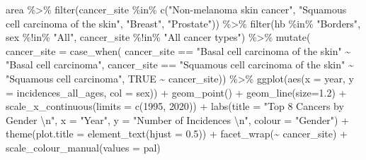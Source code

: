 \documentclass[
]{article}
\newenvironment{Shaded}{\begin{snugshade}}{\end{snugshade}}
\newcommand{\AttributeTok}[1]{\textcolor[rgb]{0.77,0.63,0.00}{#1}}
\newcommand{\ConstantTok}[1]{\textcolor[rgb]{0.00,0.00,0.00}{#1}}
\newcommand{\DecValTok}[1]{\textcolor[rgb]{0.00,0.00,0.81}{#1}}
\newcommand{\FloatTok}[1]{\textcolor[rgb]{0.00,0.00,0.81}{#1}}
\newcommand{\FunctionTok}[1]{\textcolor[rgb]{0.00,0.00,0.00}{#1}}
\newcommand{\NormalTok}[1]{#1}
\newcommand{\SpecialCharTok}[1]{\textcolor[rgb]{0.00,0.00,0.00}{#1}}
\newcommand{\StringTok}[1]{\textcolor[rgb]{0.31,0.60,0.02}{#1}}
\begin{document}
\begin{Shaded}
\begin{Highlighting}[]
\NormalTok{area }\SpecialCharTok{\%\textgreater{}\%} 
  \FunctionTok{filter}\NormalTok{(cancer\_site }\SpecialCharTok{\%in\%} \FunctionTok{c}\NormalTok{(}\StringTok{"Non{-}melanoma skin cancer"}\NormalTok{,}
                            \StringTok{"Squamous cell carcinoma of the skin"}\NormalTok{, }\StringTok{"Breast"}\NormalTok{,}
                            \StringTok{"Prostate"}\NormalTok{)) }\SpecialCharTok{\%\textgreater{}\%}
  \FunctionTok{filter}\NormalTok{(hb }\SpecialCharTok{\%in\%} \StringTok{"Borders"}\NormalTok{,}
\NormalTok{         sex }\SpecialCharTok{\%!in\%} \StringTok{"All"}\NormalTok{,}
\NormalTok{         cancer\_site }\SpecialCharTok{\%!in\%} \StringTok{"All cancer types"}\NormalTok{) }\SpecialCharTok{\%\textgreater{}\%} 
  \FunctionTok{mutate}\NormalTok{(}
  \AttributeTok{cancer\_site =} \FunctionTok{case\_when}\NormalTok{(}
\NormalTok{    cancer\_site }\SpecialCharTok{==} \StringTok{"Basal cell carcinoma of the skin"} \SpecialCharTok{\textasciitilde{}} \StringTok{"Basal cell carcinoma"}\NormalTok{,}
\NormalTok{    cancer\_site }\SpecialCharTok{==} \StringTok{"Squamous cell carcinoma of the skin"} \SpecialCharTok{\textasciitilde{}} \StringTok{"Squamous cell carcinoma"}\NormalTok{,}
    \ConstantTok{TRUE} \SpecialCharTok{\textasciitilde{}}\NormalTok{ cancer\_site)) }\SpecialCharTok{\%\textgreater{}\%} 
  \FunctionTok{ggplot}\NormalTok{(}\FunctionTok{aes}\NormalTok{(}\AttributeTok{x =}\NormalTok{ year, }\AttributeTok{y =}\NormalTok{ incidences\_all\_ages, }\AttributeTok{col =}\NormalTok{ sex)) }\SpecialCharTok{+}
  \FunctionTok{geom\_point}\NormalTok{() }\SpecialCharTok{+}
  \FunctionTok{geom\_line}\NormalTok{(}\AttributeTok{size=}\FloatTok{1.2}\NormalTok{) }\SpecialCharTok{+}
  \FunctionTok{scale\_x\_continuous}\NormalTok{(}\AttributeTok{limits =} \FunctionTok{c}\NormalTok{(}\DecValTok{1995}\NormalTok{, }\DecValTok{2020}\NormalTok{)) }\SpecialCharTok{+}
  \FunctionTok{labs}\NormalTok{(}\AttributeTok{title =} \StringTok{"Top 8 Cancers by Gender }\SpecialCharTok{\textbackslash{}n}\StringTok{"}\NormalTok{,}
       \AttributeTok{x =} \StringTok{"Year"}\NormalTok{,}
       \AttributeTok{y =} \StringTok{"Number of Incidences }\SpecialCharTok{\textbackslash{}n}\StringTok{"}\NormalTok{,}
       \AttributeTok{colour =} \StringTok{"Gender"}\NormalTok{) }\SpecialCharTok{+}
  \FunctionTok{theme}\NormalTok{(}\AttributeTok{plot.title =} \FunctionTok{element\_text}\NormalTok{(}\AttributeTok{hjust =} \FloatTok{0.5}\NormalTok{)) }\SpecialCharTok{+}
  \FunctionTok{facet\_wrap}\NormalTok{(}\SpecialCharTok{\textasciitilde{}}\NormalTok{ cancer\_site) }\SpecialCharTok{+}
  \FunctionTok{scale\_colour\_manual}\NormalTok{(}\AttributeTok{values =}\NormalTok{ pal)}
\end{Highlighting}
\end{Shaded}
\end{document}
